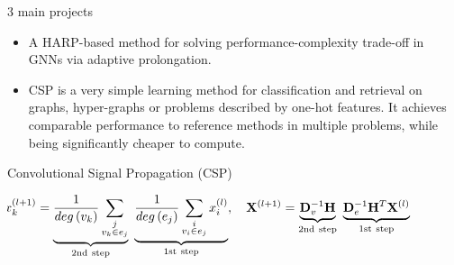\documentclass{beamer}
\newlength{\colwidth}
\newcommand{\mathmat}{\ensuremath{\mathbf}}
\newcommand{\uu}{v} %
\newcommand{\vv}{e} %
\newcommand{\HH}{\mathmat{H}} %
\newcommand{\D}{\mathmat{D}_v} %
\newcommand{\B}{\mathmat{D}_e} %
\begin{document}
\begin{frame}[fragile,t]
\begin{columns}[t]
	\begin{column}{\colwidth}
		\begin{alertblock}{3 main projects}
			\begin{itemize}
				\item A HARP-based method for solving performance-complexity trade-off in GNNs via adaptive prolongation.
				\item CSP is a very simple learning method for classification and retrieval on graphs, hyper-graphs or problems described by one-hot features. It achieves comparable performance to reference methods in multiple problems, while being significantly cheaper to compute.
			\end{itemize}
		\end{alertblock}

			\begin{block}{Convolutional Signal Propagation (CSP)}
				\begin{center}
				\end{center}
				\begin{equation*}
					\hspace*{-1.5cm}
					x_k^{(l+1)} = \underbrace{%
						\frac{1}{deg\left( \uu_k \right)}\sum_{\substack{j \\ \uu_k \in \vv_j}}
					}_{\mathrm{2nd~step}} \
					\underbrace{
						\frac{1}{deg \left( \vv_j \right)}\sum_{\substack{i \\ \uu_i \in \vv_j}} x_i^{(l)}
					}_{\mathrm{1st~step}},\quad
					\mathmat{X}^{(l+1)} = \underbrace{\D^{-1} \HH}_{\mathrm{2nd~step}} \ \underbrace{\B^{-1} \HH^T \mathmat{X}^{(l)}}_{\mathrm{1st~step}}
				\end{equation*}
			\end{block}


\end{column}
\end{columns}
\end{frame}
\end{document}
